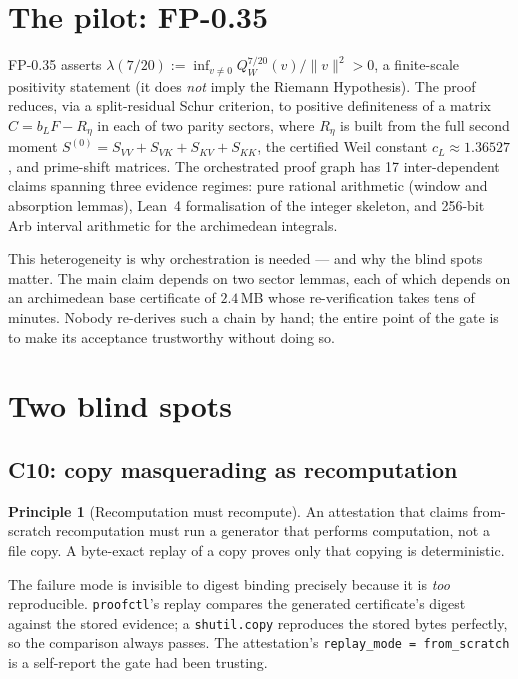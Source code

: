 \documentclass[11pt,a4paper]{amsart}
\theoremstyle{plain}
\theoremstyle{definition}
\newtheorem{principle}[theorem]{Principle}
\newcommand{\proofctl}{\texttt{proofctl}}
\newcommand{\CtenA}{\textsf{C10}}
\begin{document}
\section{The pilot: FP-0.35}
\label{sec:fp035}

FP-0.35 asserts $\lambda(7/20) := \inf_{v\neq0} Q_W^{7/20}(v)/\|v\|^2 > 0$, a
finite-scale positivity statement (it does \emph{not} imply the Riemann
Hypothesis). The proof reduces, via a split-residual Schur criterion, to positive
definiteness of a matrix $C = b_L F - R_\eta$ in each of two parity sectors, where
$R_\eta$ is built from the full second moment
$S^{(0)} = S_{VV}+S_{VK}+S_{KV}+S_{KK}$, the certified Weil constant
$c_L \approx 1.36527$, and prime-shift matrices. The orchestrated proof graph
has 17 inter-dependent claims spanning three evidence regimes: pure rational
arithmetic (window and absorption lemmas), Lean~4 formalisation of the integer
skeleton, and 256-bit Arb interval arithmetic for the archimedean integrals.

This heterogeneity is why orchestration is needed --- and why the blind spots
matter. The main claim depends on two sector lemmas, each of which depends on an
archimedean base certificate of $2.4$\,MB whose re-verification takes tens of
minutes. Nobody re-derives such a chain by hand; the entire point of the gate is
to make its acceptance trustworthy without doing so.

\section{Two blind spots}
\label{sec:blindspots}

\subsection{\texorpdfstring{\CtenA}{C10}: copy masquerading as recomputation}

\begin{principle}[Recomputation must recompute]
An attestation that claims from-scratch recomputation must run a generator that
performs computation, not a file copy. A byte-exact replay of a copy proves only
that copying is deterministic.
\end{principle}

The failure mode is invisible to digest binding precisely because it is
\emph{too} reproducible. \proofctl{}'s replay compares the generated certificate's
digest against the stored evidence; a \texttt{shutil.copy} reproduces the stored
bytes perfectly, so the comparison always passes. The attestation's
\texttt{replay\_mode = from\_scratch} is a self-report the gate had been trusting.
\end{document}
